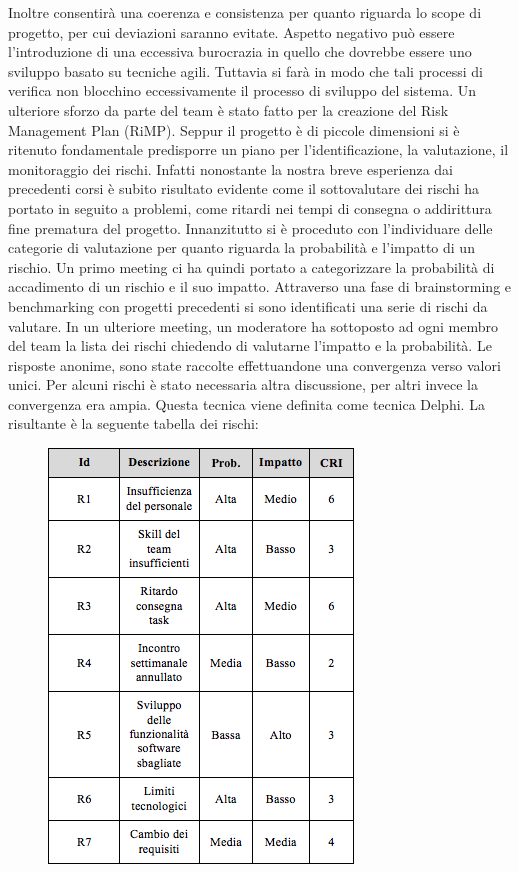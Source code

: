 {Inoltre consentir\`{a} una coerenza e consistenza per quanto riguarda lo scope di progetto, per cui deviazioni saranno evitate.
Aspetto negativo pu\`{o} essere l\rq introduzione di una eccessiva burocrazia in quello che dovrebbe essere uno sviluppo basato su tecniche agili. Tuttavia si far\`{a} in modo che tali processi di verifica non blocchino eccessivamente il processo di sviluppo del sistema.
Un ulteriore sforzo da parte del team \`{e} stato fatto per la creazione del Risk Management Plan (RiMP).
Seppur il progetto \`{e} di piccole dimensioni si \`{e} ritenuto fondamentale predisporre un piano per l\rq identificazione, la valutazione, il monitoraggio dei rischi.
Infatti nonostante la nostra breve esperienza dai precedenti corsi \`{e} subito risultato evidente come il sottovalutare dei rischi ha portato in seguito a problemi, come ritardi nei tempi di consegna o addirittura fine prematura del progetto.
Innanzitutto si \`{e} proceduto con l’individuare delle categorie di valutazione per quanto riguarda la probabilit\`{a} e l’impatto di un rischio.
Un primo meeting ci ha quindi portato a categorizzare la probabilit\`{a} di accadimento di un rischio e il suo impatto.
Attraverso una fase di brainstorming e benchmarking con progetti precedenti si sono identificati una serie di rischi da valutare. 
In un ulteriore meeting, un moderatore ha sottoposto ad ogni membro del team la lista dei rischi chiedendo di valutarne l’impatto e la probabilit\`{a}. Le risposte anonime, sono state raccolte effettuandone una convergenza verso valori unici.
Per alcuni rischi \`{e} stato necessaria altra discussione, per altri invece la convergenza era ampia. Questa tecnica viene definita come tecnica Delphi.
La risultante \`{e} la seguente tabella dei rischi:
\begin{figure}[h]
\centering
\includegraphics[scale=.6]{img/17.png}

\end{figure}}
